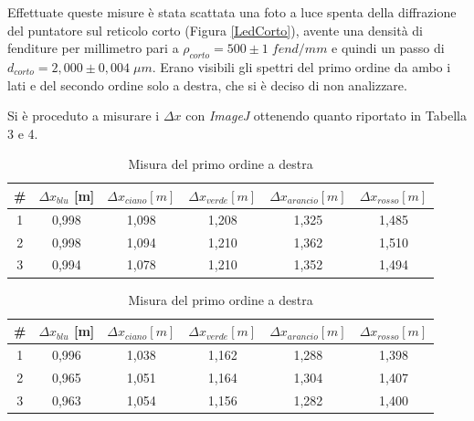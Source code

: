 \documentclass{article}
\begin{document}
\clearpage

Effettuate queste misure è stata scattata una foto a luce spenta della diffrazione del puntatore sul reticolo corto (Figura \ref{LedCorto}), avente una densità di fenditure per millimetro pari a $\rho_{corto} = 500 \pm 1\; fend/mm $ e quindi un passo di $d_{corto} = 2,000 \pm 0,004 \; \mu m $. Erano visibili  gli spettri del primo ordine da ambo i lati e del secondo ordine solo a destra, che si è deciso di non analizzare.

\vspace{3mm}

Si è proceduto a misurare i $ \Delta x $ con \textit{ImageJ} ottenendo quanto riportato in Tabella 3 e 4.

\begin{table}[h]
        \centering
        \begin{tabular}{||c|c|c|c|c|c||}
            \hline
            \# & \cellcolor{blue}$\Delta x_{blu}$ [m] & \cellcolor{cyan}$\Delta x_{ciano}[m]$ & \cellcolor{green}$\Delta x_{verde}[m]$ & \cellcolor{orange}$\Delta x_{arancio}[m]$ & \cellcolor{red}$\Delta x_{rosso}[m]$ \\
            \hline
            1 & 0,998 & 1,098 & 1,208 & 1,325 & 1,485 \\
            2 & 0,998 & 1,094 & 1,210 & 1,362 & 1,510 \\
            3 & 0,994 & 1,078 & 1,210 & 1,352 & 1,494 \\
            \hline
        \end{tabular}
        \caption{Misura del primo ordine a sinistra}
    \centering
    \begin{tabular}{||c|c|c|c|c|c||}
        \hline
        \# & \cellcolor{blue}$\Delta x_{blu}$ [m] & \cellcolor{cyan}$\Delta x_{ciano}[m]$ & \cellcolor{green}$\Delta x_{verde}[m]$ & \cellcolor{orange}$\Delta x_{arancio}[m]$ & \cellcolor{red}$\Delta x_{rosso}[m]$ \\
        \hline
        1 & 0,996 & 1,038 & 1,162 & 1,288 & 1,398 \\
        2 & 0,965 & 1,051 & 1,164 & 1,304 & 1,407\\
        3 & 0,963 & 1,054 & 1,156 & 1,282 & 1,400 \\
        \hline
    \end{tabular}
    \caption{Misura del primo ordine a destra}
\end{table}
\end{document}

